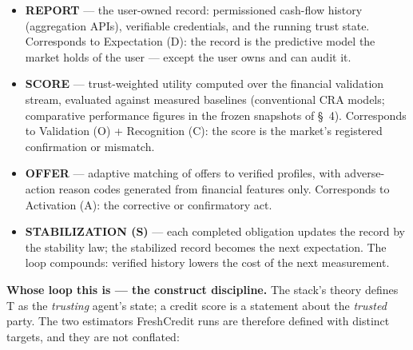 \documentclass[11pt,twocolumn]{article}
\begin{document}
\begin{itemize}
\item \textbf{REPORT} --- the user-owned record: permissioned cash-flow history (aggregation APIs), verifiable credentials, and the running trust state. Corresponds to Expectation (D): the record is the predictive model the market holds of the user --- except the user owns and can audit it.
\item \textbf{SCORE} --- trust-weighted utility computed over the financial validation stream, evaluated against measured baselines (conventional CRA models; comparative performance figures in the frozen snapshots of \S~4). Corresponds to Validation (O) + Recognition (C): the score is the market's registered confirmation or mismatch.
\item \textbf{OFFER} --- adaptive matching of offers to verified profiles, with adverse-action reason codes generated from financial features only. Corresponds to Activation (A): the corrective or confirmatory act.
\item \textbf{STABILIZATION (S)} --- each completed obligation updates the record by the stability law; the stabilized record becomes the next expectation. The loop compounds: verified history lowers the cost of the next measurement.
\end{itemize}

\textbf{Whose loop this is --- the construct discipline.} The stack's theory defines T as the \emph{trusting} agent's state; a credit score is a statement about the \emph{trusted} party. The two estimators FreshCredit runs are therefore defined with distinct targets, and they are not conflated:
\end{document}

